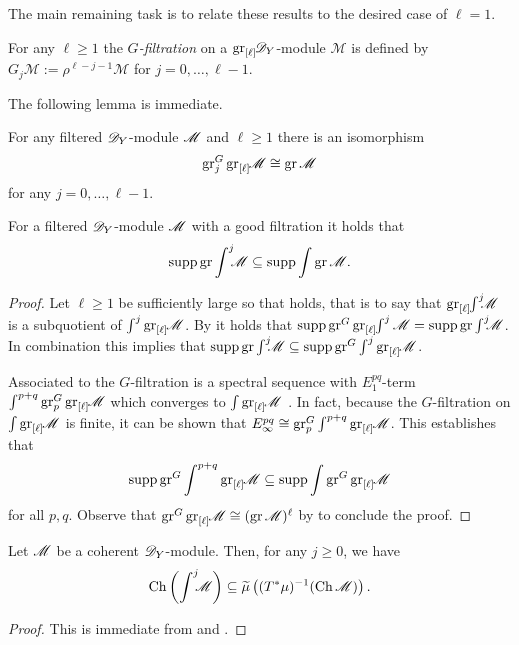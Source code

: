 The main remaining task is to relate these results to the desired case of $\ell = 1$.
\begin{definition}
  For any $\ell \geq 1$ the {\it $G$-filtration} on a $\grl\D_Y$-module $\mathcal{M}$ is defined by $G_{j} \mathcal{M} := \rho^{\ell - j-1}\mathcal{M}$ for $j=0,\ldots, \ell-1$.
\end{definition}
The following lemma is immediate.
\begin{lemma}\label{lem: GradedGGradedLYieldsGraded}
  For any filtered $\D_Y$-module $\M$ and $\ell \geq 1$ there is an isomorphism
  $$\gr^G_j \grl \M \cong \gr\M$$
  for any $j= 0,\ldots, \ell - 1$.
\end{lemma}
\begin{proposition}\label{prop: SuppGrrelIntInclusion}
  For a filtered $\D_Y$-module $\M$ with a good filtration it holds that  $$\supp \gr\IntJ{j}\M \subseteq \supp \int \gr\M.$$
\end{proposition}
\begin{proof}
  Let $\ell\geq 1$ be sufficiently large so that  holds, that is to say that $\grl\IntJ{j} \M$ is a subquotient of $\int^j \grl \M$.
  By  it holds that $\supp \gr^G \grl\int^j\M = \supp \gr \IntJ{j}\M$. 
  In combination this implies that $\supp\gr\IntJ{j}\M \subseteq \supp \gr^G\int^j\grl \M$.
  
  
   Associated to the $G$-filtration is a spectral sequence with $E_1^{pq}$-term $\int^{p+q} \gr^G_p \grl \M$ which converges to $\int \grl \M$ \cite[Section 62.8]{stacks-project}. 
   In fact, because the $G$-filtration on $\int \grl \M$ is finite, it can be shown that $E_\infty^{pq} \cong \gr^G_p \int^{p+q}\grl \M$.
    This establishes that 
    $$\supp \gr^G \int^{p+q} \grl \M \subseteq \supp \int\gr^G\grl\M$$
    for all $p,q$. 
    Observe that $\gr^G \grl \M \cong (\gr\M)^\ell $ by 
    to conclude the proof. 
\end{proof}
\begin{theorem}\label{thm: KashiwaraEstimate}
    Let $\M$ be a coherent $\D_Y$-module. Then, for any $j\geq 0$, we have
    $$\Ch\left(\IntJ{j} \M \right)\subseteq  \widetilde{\mu}\left((T^*\mu)^{-1}(\Ch \M) \right).$$
\end{theorem}
\begin{proof}
  This is immediate from  and .
\end{proof}

